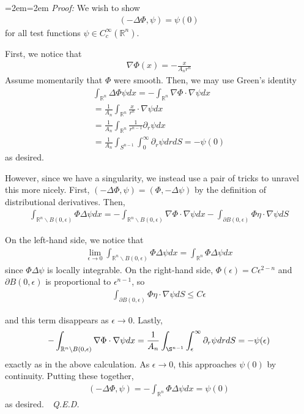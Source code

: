 \documentclass{article}
\newcommand{\R}{{\mathbb{R}}}
\newcommand{\pd}{\partial}
\newenvironment{pf}{%
	\par%
	\medskip
	\leftskip=2em\rightskip=2em%
	\noindent\ignorespaces \textit{Proof:} \newline}{%
	\,\, \newline \textit{Q.E.D.}\par\medskip}
\begin{document}
	\begin{pf}
		We wish to show 
		\begin{align*}
			(-\Delta \Phi, \psi) = \psi(0)
		\end{align*}
		for all test functions $\psi \in C_{c}^{\infty}(\R^{n})$. 
		
		First, we notice that 
		\begin{align*}
			\nabla \Phi(x) = -\frac{x}{A_{n}r^{n}}
		\end{align*}
		Assume momentarily that $\Phi$ were smooth. Then, we may use Green's identity
		\begin{align*}
			\int_{\R^{n}} \Delta\Phi  \psi dx = - \int_{\R^{n}} \nabla \Phi \cdot \nabla \psi dx \\
			= \frac{1}{A_{n}} \int_{\R^{n}} \frac{x}{r^{n}} \cdot \nabla \psi dx \\
			= \frac{1}{A_{n}} \int_{\R^{n}} \frac{1}{r^{n-1}} \pd_{r} \psi dx \\
			= \frac{1}{A_{n}} \int_{S^{n-1}} \int_{0}^{\infty} \pd_{r} \psi drdS = - \psi(0)
		\end{align*}
		as desired. 
		
		However, since we have a singularity, we instead use a pair of tricks to unravel this more nicely. First, $(-\Delta \Phi, \psi) = (\Phi, - \Delta \psi)$ by the definition of distributional derivatives. Then, 
		\begin{align*}
			\int_{\R^{n} \backslash B(0,\epsilon)} \Phi \Delta \psi dx = - \int_{\R^{n}\backslash B(0,\epsilon)} \nabla \Phi \cdot \nabla \psi dx - \int_{\pd B(0,\epsilon)} \Phi \eta \cdot \nabla \psi dS
		\end{align*}
		
		On the left-hand side, we notice that 
		\begin{align*}
			\lim_{\epsilon \to 0}\int_{\R^{n} \backslash B(0,\epsilon)} \Phi \Delta \psi dx  = \int_{\R^{n}} \Phi \Delta \psi dx 
		\end{align*}
		since $\Phi \Delta \psi$ is locally integrable. On the right-hand side, $\Phi(\epsilon)= C\epsilon^{2-n}$ and $\pd B(0,\epsilon) $ is proportional to $\epsilon^{n-1}$, so 
		\begin{align*}
			\int_{\pd B(0,\epsilon)} \Phi \eta \cdot \nabla \psi dS \leq C \epsilon
		\end{align*}
		
		and this term disappears as $\epsilon \to 0$. Lastly, 
		\begin{align*}
			-\int_{\R^{n} \backslash B(0,\epsilon)} \nabla \Phi \cdot \nabla \psi dx = \frac{1}{A_{n}} \int_{\S^{n-1}} \int_{\epsilon}^{\infty} \pd_{r} \psi drdS = - \psi(\epsilon)
		\end{align*}
		exactly as in the above calculation. As $\epsilon \to 0$, this approaches $\psi(0)$ by continuity. Putting these together, 
		\begin{align*}
			(-\Delta \Phi, \psi) = -\int_{\R^{n}} \Phi \Delta \psi dx = \psi(0)
		\end{align*}
		as desired. 
	\end{pf}
	
\end{document}
